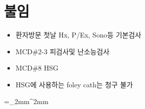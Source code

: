 \section{불임}
%
{
\begin{itemize}\tightlist
\item 환자방문 첫날 Hx, P/Ex, Sono등 기본검사
\item MCD\#2-3 피검사및 난소능검사
\item MCD\#8 HSG
\item HSG에 사용하는 foley cath는 청구 불가
\end{itemize}
}%
\tabulinesep =_2mm^2mm
